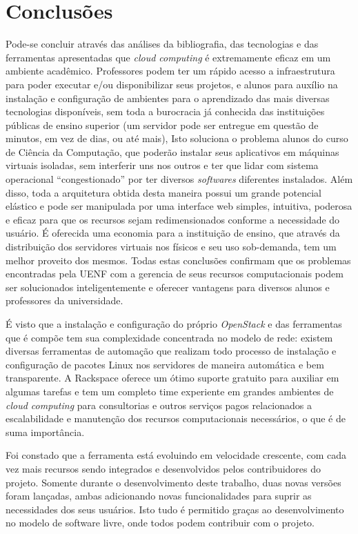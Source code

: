 \chapter{Conclusões}
\label{cha:conclusoes}

Pode-se concluir através das análises da bibliografia, das tecnologias e das
ferramentas apresentadas que \emph{cloud computing} é extremamente eficaz em
um ambiente acadêmico. Professores podem ter um rápido acesso a infraestrutura
para poder executar e/ou disponibilizar seus projetos, e alunos para auxílio
na instalação e configuração de ambientes para o aprendizado das mais diversas
tecnologias disponíveis, sem toda a burocracia já conhecida das instituições
públicas de ensino superior
(um servidor pode ser entregue em questão de minutos, em vez de dias, ou até mais),
Isto soluciona o problema alunos do curso de Ciência da Computação, que poderão
instalar seus aplicativos em máquinas virtuais isoladas, sem interferir uns nos
outros e ter que lidar com sistema operacional ``congestionado'' por ter diversos
\emph{softwares} diferentes instalados.
Além disso, toda a arquitetura obtida desta maneira possui um grande potencial
elástico e pode ser manipulada por uma interface web simples, intuitiva, poderosa
e eficaz para que os recursos sejam redimensionados conforme a necessidade do usuário.
É oferecida uma economia para a instituição de ensino, que através da
distribuição dos servidores virtuais nos físicos e seu uso sob-demanda, tem um
melhor proveito dos mesmos. Todas estas conclusões confirmam que os problemas
encontradas pela UENF com a gerencia de seus recursos computacionais podem
ser solucionados inteligentemente e oferecer vantagens para diversos alunos
e professores da universidade.

É visto que a instalação e configuração do próprio \emph{OpenStack} e das
ferramentas que é compõe tem sua complexidade concentrada no modelo de rede:
existem diversas ferramentas de automação que realizam todo processo de instalação
e configuração de pacotes Linux nos servidores de maneira automática e bem
transparente. A Rackspace oferece um ótimo suporte gratuito para auxiliar em
algumas tarefas e tem um completo time experiente em grandes ambientes de
\emph{cloud computing} para consultorias e outros serviços pagos relacionados
a escalabilidade e manutenção dos recursos computacionais necessários, o que é
de suma importância.

Foi constado que a ferramenta está evoluindo em velocidade crescente, com cada
vez mais recursos sendo integrados e desenvolvidos pelos contribuidores do projeto.
Somente durante o desenvolvimento deste trabalho, duas novas versões foram lançadas,
ambas adicionando novas funcionalidades para suprir as necessidades dos seus
usuários. Isto tudo é permitido graças ao desenvolvimento no modelo de software
livre, onde todos podem contribuir com o projeto.


